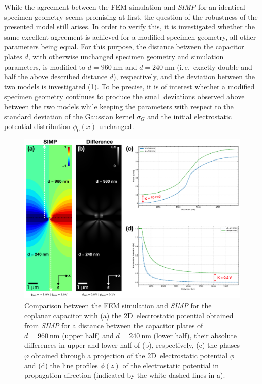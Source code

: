 While the agreement between the FEM simulation and \emph{SIMP} for an identical specimen geometry seems promising at first, the question of the robustness of the presented model still arises. In order to verify this, it is investigated whether the same excellent agreement is achieved for a modified specimen geometry, all other parameters being equal.
\newpage
For this purpose, the distance between the capacitor plates $d$, with otherwise unchanged specimen geometry and simulation parameters, is modified to $d = \SI{960}{\nm}$ and $d = \SI{240}{\nm}$ (i.\,e.\ exactly double and half the above described distance $d$), respectively, and the deviation between the two models is investigated (\cref{fig:capacitor-FEM-SIMP-comparison-varying-distance}). To be precise, it is of interest whether a modified specimen geometry continues to produce the small deviations observed above between the two models while keeping the parameters with respect to the standard deviation of the Gaussian kernel $\sigma_G$ and the initial electrostatic potential distribution $\phi_0\left(x\right)$ unchanged.
\begin{figure}[H]
	\centering
	\includegraphics[width=\textwidth]{Figures/Results/Capacitor/Simulations/capacitor-FEM-SIMP-comparison-varying-distance.pdf}
	\caption{Comparison between the FEM simulation and \emph{SIMP} for the coplanar capacitor with (a) the 2D~electrostatic potential obtained from \emph{SIMP} for a distance between the capacitor plates of $d = \SI{960}{\nm}$ (upper half) and $d = \SI{240}{\nm}$ (lower half), their absolute differences in upper and lower half of (b), respectively, (c) the phases $\varphi$ obtained through a projection of the 2D~electrostatic potential $\phi$ and (d) the line profiles $\phi\left(z\right)$ of the electrostatic potential in propagation direction (indicated by the white dashed lines in a).}
	\label{fig:capacitor-FEM-SIMP-comparison-varying-distance}
\end{figure}
